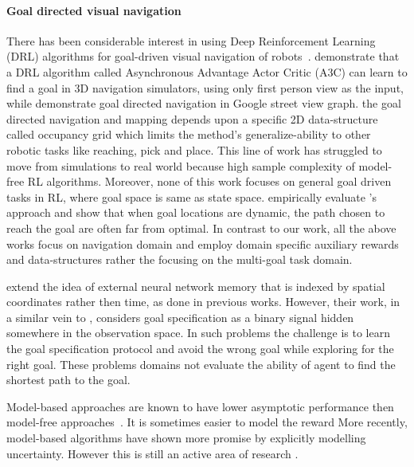 \paragraph{Goal directed visual navigation}
There has been considerable interest in using Deep Reinforcement Learning (DRL)
algorithms for goal-driven visual navigation of
robots~\citep{mirowski2016learning,MiPaViICLR2017,dhiman2018critical,gupta2017cognitive,savinov2018semi}.
\cite{mirowski2016learning} demonstrate that a DRL algorithm called Asynchronous
Advantage Actor Critic (A3C) can learn to find a goal in 3D navigation
simulators, using only first person view as the input, while
\cite{MiPaViICLR2017} demonstrate goal directed navigation in Google street view
graph. \citet{gupta2017cognitive} the goal directed navigation and mapping
depends upon a specific 2D data-structure called occupancy grid which limits the
method's generalize-ability to other robotic tasks like reaching, pick and
place. This line of work has struggled to move from simulations to real world
because high sample complexity of model-free RL algorithms. Moreover, none of
this work focuses on general goal driven tasks in RL, where goal space is same
as state space. \citet{dhiman2018critical} empirically evaluate
\cite{mirowski2016learning}'s approach and show that when goal locations are
dynamic, the path chosen to reach the goal are often far from optimal.
In contrast to our work, all the above works focus on navigation domain and
employ domain specific auxiliary rewards and data-structures rather the focusing
on the multi-goal task domain.

\cite{Binary goal related tasks}
\citet{parisotto2017neural} extend the idea of external neural network memory
that is indexed by spatial coordinates rather then time, as done in previous
works. However, their work, in a similar vein to \cite{OhChSiICML2016},
considers goal specification as a binary signal hidden somewhere in the
observation space. In such problems the challenge is to learn the goal
specification protocol and avoid the wrong goal while exploring for the right
goal. These problems domains not evaluate the ability of agent to find the
shortest path to the goal.

\cite{Model-based RL}
Model-based approaches are known to have lower asymptotic performance
then model-free approaches~\cite{pong2018temporal}. It is sometimes easier to
model the reward 
More recently, model-based algorithms have
shown more promise by explicitly modelling uncertainty. However this is
still an active area of research \cite{lakshminarayanan2017simple,
kurutach2018model,zhang2018solar}.

